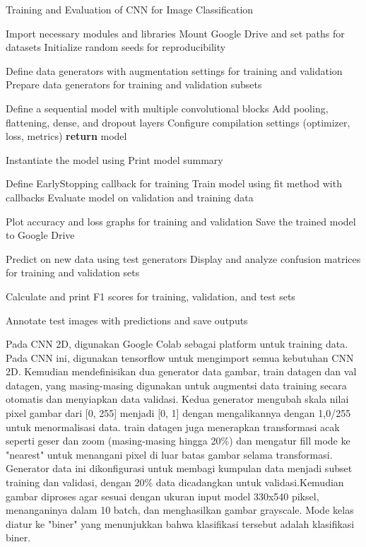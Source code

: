 \begin{algorithm}
  \caption{Training and Evaluation of CNN for Image Classification}
  \begin{algorithmic}[1]
  \State Import necessary modules and libraries
  \State Mount Google Drive and set paths for datasets
  \State Initialize random seeds for reproducibility
  
  \State Define data generators with augmentation settings for training and validation
  \State Prepare data generators for training and validation subsets
  
      \State Define a sequential model with multiple convolutional blocks
      \State Add pooling, flattening, dense, and dropout layers
      \State Configure compilation settings (optimizer, loss, metrics)
      \State \textbf{return} model
  \EndFunction
  
  \State Instantiate the model using 
  \State Print model summary
  
  \State Define EarlyStopping callback for training
  \State Train model using fit method with callbacks
  \State Evaluate model on validation and training data
  
  \State Plot accuracy and loss graphs for training and validation
  \State Save the trained model to Google Drive
  
  \State Predict on new data using test generators
  \State Display and analyze confusion matrices for training and validation sets
  
  \State Calculate and print F1 scores for training, validation, and test sets
  
  \State Annotate test images with predictions and save outputs
  
  \end{algorithmic}
\end{algorithm}

Pada CNN 2D, digunakan Google Colab sebagai platform untuk training data. Pada CNN ini, digunakan tensorflow untuk mengimport semua kebutuhan CNN 2D. Kemudian mendefinisikan dua generator data gambar, train datagen dan val datagen, yang masing-masing digunakan untuk augmentsi data training secara otomatis dan menyiapkan data validasi. Kedua generator mengubah skala nilai pixel gambar dari [0, 255] menjadi [0, 1] dengan mengalikannya dengan 1,0/255 untuk menormalisasi data. train datagen juga menerapkan transformasi acak seperti geser dan zoom (masing-masing hingga 20\%) dan mengatur fill mode ke "nearest" untuk menangani pixel di luar batas gambar selama transformasi. Generator data ini dikonfigurasi untuk membagi kumpulan data menjadi subset training dan validasi, dengan 20\% data dicadangkan untuk validasi.Kemudian gambar diproses agar sesuai dengan ukuran input model 330x540 piksel, menanganinya dalam 10 batch, dan menghasilkan gambar grayscale. Mode kelas diatur ke "biner" yang menunjukkan bahwa klasifikasi tersebut adalah klasifikasi biner.

